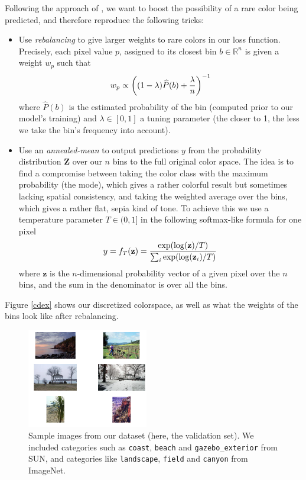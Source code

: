 \documentclass[10pt,twocolumn,letterpaper]{article}
\begin{document}
Following the approach of \cite{zhang2016colorful}, we want to boost the possibility of a rare color being predicted, and therefore reproduce the following tricks:
\begin{itemize}
\item Use \textit{rebalancing} to give larger weights to rare colors in our loss function. Precisely, each pixel value $p$, assigned to its closest bin $b \in \mathbb{R}^n$ is given a weight $w_p$ such that $$w_p \propto \left( (1-\lambda) \widehat{P}(b) + {\lambda \over n} \right)^{-1}$$ where $\widehat{P}(b)$ is the estimated probability of the bin (computed prior to our model's training) and $\lambda \in [0,1]$ a tuning parameter (the closer to 1, the less we take the bin's frequency into account).
\item Use an \textit{annealed-mean} to output predictions $y$ from the probability distribution $\textbf{Z}$ over our $n$ bins to the full original color space. The idea is to find a compromise between taking the color class with the maximum probability (the mode), which gives a rather colorful result but sometimes lacking spatial consistency, and taking the weighted average over the bins, which gives a rather flat, sepia kind of tone. To achieve this we use a temperature parameter $T \in (0,1]$ in the following softmax-like formula for one pixel $$y = f_T(\textbf{z}) = {\exp(\log(\textbf{z}) / T) \over \sum_i \exp(\log(\textbf{z}_i) / T)}$$ where $\textbf{z}$ is the $n$-dimensional probability vector of a given pixel over the $n$ bins, and the sum in the denominator is over all the bins.
\end{itemize}



Figure \ref{cdex} shows our discretized colorspace, as well as what the weights of the bins look like after rebalancing.
\begin{figure}
\begin{center}
\includegraphics[width=200px]{sampletrain.png}
\caption{Sample images from our dataset (here, the validation set). We included categories such as \texttt{coast}, \texttt{beach} and \texttt{gazebo\_exterior} from SUN, and categories like \texttt{landscape}, \texttt{field} and \texttt{canyon} from ImageNet.}
\label{sampletrain}
\end{center}
\end{figure}
\end{document}
